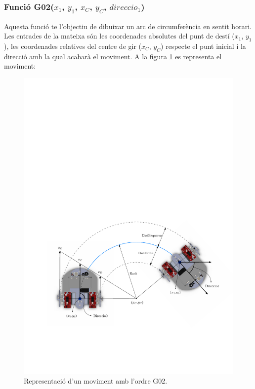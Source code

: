 \subsubsection{Funció G02($x_{1}$, $y_{1}$, $x_{C}$, $y_{C}$, $direccio_{1}$)}\label{funG02}

Aquesta funció te l’objectiu de dibuixar un arc de circumferència en sentit horari. Les entrades de la mateixa són les coordenades absolutes del punt de destí ($x_{1}$, $y_{1}$), les coordenades relatives del centre de gir ($x_{C}$, $y_{C}$) respecte el punt inicial i la direcció amb la qual acabarà el moviment. A la figura \ref{fig:G02} es representa el moviment:

\begin{figure}[H]
	\centering
	\includegraphics[scale=0.9]{G02}
	\caption{Representació d'un moviment amb l'ordre G02.}
	\label{fig:G02}
\end{figure}

